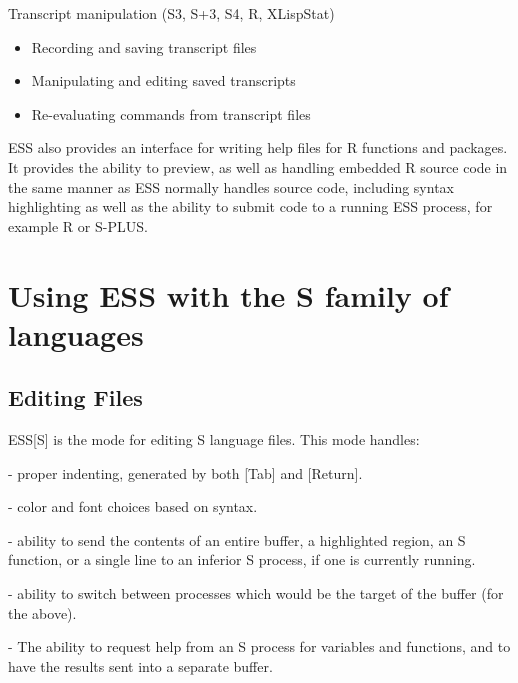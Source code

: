 \documentclass{article}
\newcommand*{\Splus}{\textsc{S-PLUS}}
\begin{document}
Transcript manipulation (S3, S+3, S4, R, XLispStat)
\begin{itemize}
\item Recording and saving transcript files
\item Manipulating and editing saved transcripts
\item Re-evaluating commands from transcript files
\end{itemize}

ESS also provides an interface for writing help files for R functions
and packages.    It provides the ability to preview, as well as
handling embedded R source code in the same manner as ESS normally
handles source code, including syntax highlighting as well as the
ability to submit code to a running ESS process, for example R or
\Splus. 


\section{Using ESS with the S family of languages}
\label{sec:S}

\subsection{Editing Files}
\label{sec:S:edit}


ESS[S] is the mode for editing S language files.  This mode handles:

- proper indenting, generated by both [Tab] and [Return].

- color and font choices based on syntax.

- ability to send the contents of an entire buffer, a highlighted
  region, an S function, or a single line to an inferior S process, if
  one is currently running.

- ability to switch between processes which would be the target of the 
  buffer (for the above).

- The ability to request help from an S process for variables and
  functions, and to have the results sent into a separate buffer.
\end{document}
